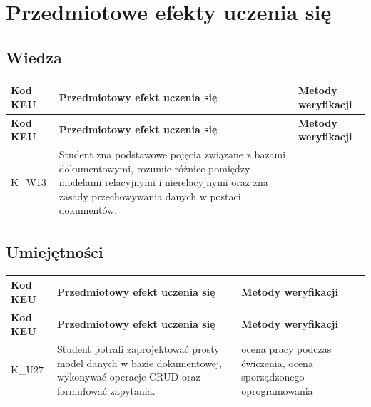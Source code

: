 \documentclass[12pt, a4paper]{article}
\newcommand{\thdrule}{\noalign{\global\setlength{\extrarowheight}{0pt}}}
\newcommand{\thdend}{\noalign{\global\setlength{\extrarowheight}{3pt}}}
\begin{document}
\section{Przedmiotowe efekty uczenia się}

\subsection*{Wiedza}
{\scriptsize
\begin{longtable}{m{1.6cm}m{9.0cm}m{4.2cm}}
\thdrule\toprule
\rowcolor{pjatkRed} {\color{white}\footnotesize\textbf{\vphantom{Ag}Kod KEU}} & {\color{white}\footnotesize\textbf{\vphantom{Ag}Przedmiotowy efekt uczenia się}} & {\color{white}\footnotesize\textbf{\vphantom{Ag}Metody weryfikacji}} \\
\midrule\thdend
\endfirsthead
\thdrule\toprule
\rowcolor{pjatkRed} {\color{white}\footnotesize\textbf{\vphantom{Ag}Kod KEU}} & {\color{white}\footnotesize\textbf{\vphantom{Ag}Przedmiotowy efekt uczenia się}} & {\color{white}\footnotesize\textbf{\vphantom{Ag}Metody weryfikacji}} \\
\midrule\thdend
\endhead
  \rowcolor{tableRowLight} K\_W13 & Student zna podstawowe pojęcia związane z bazami dokumentowymi, rozumie różnice pomiędzy modelami relacyjnymi i nierelacyjnymi oraz zna zasady przechowywania danych w postaci dokumentów. &  \\
\bottomrule
\end{longtable}}

\subsection*{Umiejętności}
{\scriptsize
\begin{longtable}{m{1.6cm}m{9.0cm}m{4.2cm}}
\thdrule\toprule
\rowcolor{pjatkRed} {\color{white}\footnotesize\textbf{\vphantom{Ag}Kod KEU}} & {\color{white}\footnotesize\textbf{\vphantom{Ag}Przedmiotowy efekt uczenia się}} & {\color{white}\footnotesize\textbf{\vphantom{Ag}Metody weryfikacji}} \\
\midrule\thdend
\endfirsthead
\thdrule\toprule
\rowcolor{pjatkRed} {\color{white}\footnotesize\textbf{\vphantom{Ag}Kod KEU}} & {\color{white}\footnotesize\textbf{\vphantom{Ag}Przedmiotowy efekt uczenia się}} & {\color{white}\footnotesize\textbf{\vphantom{Ag}Metody weryfikacji}} \\
\midrule\thdend
\endhead
  \rowcolor{tableRowLight} K\_U27 & Student potrafi zaprojektować prosty model danych w bazie dokumentowej, wykonywać operacje CRUD oraz formułować zapytania. & ocena pracy podczas ćwiczenia, ocena sporządzonego oprogramowania \\
\bottomrule
\end{longtable}}
\end{document}

